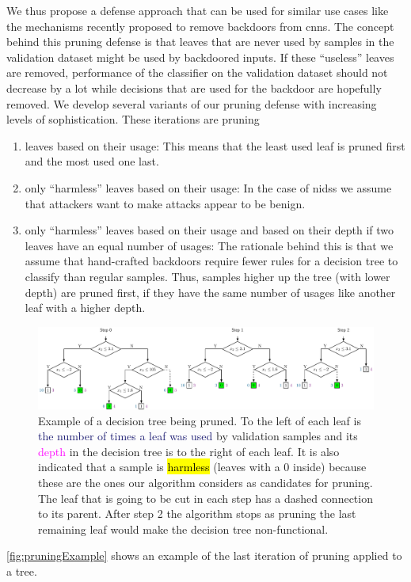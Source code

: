 \documentclass[10pt,sigconf,letterpaper,dvipsnames]{acmart}
\begin{document}
We thus propose a defense approach that can be used for similar use cases like the mechanisms recently proposed to remove backdoors from \glspl{cnn}. The concept behind this pruning defense is that leaves that are never used by samples in the validation dataset might be used by backdoored inputs. If these ``useless'' leaves are removed, performance of the classifier on the validation dataset should not decrease by a lot while decisions that are used for the backdoor are hopefully removed. We develop several variants of our pruning defense with increasing levels of sophistication. These iterations are pruning
\begin{enumerate}
\item leaves based on their usage: This means that the least used leaf is pruned first and the most used one last. 
\item only ``harmless'' leaves based on their usage: In the case of \glspl{nids} we assume that attackers want to make attacks appear to be benign. 
\item only ``harmless'' leaves based on their usage and based on their depth if two leaves have an equal number of usages: The rationale behind this is that we assume that hand-crafted backdoors require fewer rules for a decision tree to classify than regular samples. Thus, samples higher up the tree (with lower depth) are pruned first, if they have the same number of usages like another leaf with a higher depth. 
\end{enumerate}
\begin{figure}[h]
\includegraphics[width=\textwidth]{pruning_example.pdf}
\caption{Example of a decision tree being pruned. To the left of each leaf is \textcolor{MidnightBlue}{the number of times a leaf was used} by validation samples and its \textcolor{Fuchsia}{depth} in the decision tree is to the right of each leaf. It is also indicated that a sample is \protect{} \hl{harmless} (leaves with a 0 inside) because these are the ones our algorithm considers as candidates for pruning. The leaf that is going to be cut in each step has a dashed connection to its parent. After step 2 the algorithm stops as pruning the last remaining leaf would make the decision tree non-functional.}
\label{fig:pruningExample}
\end{figure}
\autoref{fig:pruningExample} shows an example of the last iteration of pruning applied to a tree.
\end{document}
